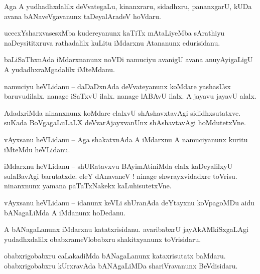 \documentclass{article}
\begin{document}
\begin{mng}%
Aga A yudhadhxdalilx deVvategaLu, kinanxraru, sidadhxru, pananxgarU, kUDa avana bANaveVgavanunx 
taDeyalAradeV hoVdaru.
\end{mng}

\begin{mng}%
ucecxYsharxvasesxMba kudereyanunx kaTiTx mAtaLiyeMba sArathiyu naDeysititxruva rathadalilx kuLitu 
iMdarxnu Atananunx edurisidanu.
\end{mng}

\begin{mng}%
baLiSaThxnAda iMdarxnanunx noVDi namuciyu avanigU avana anuyAyigaLigU A yudadhxraMgadalilx iMteMdanu.
\end{mng}

\begin{mng}%
namuciyu heVLidanu -- daDaDxnAda deVvateyanunx koMdare yashasUsx baruvudilalx. nanage iSaTxvU 
ilalx. nanage lABAvU ilalx. A jayavu jayavU alalx.
\end{mng}

\begin{mng}%
AdadxriMda ninanxnunx koMdare elalxvU shAshavxtavAgi sididhxsutatxve. suKada BoVgagaLuLaLX 
deVvarAjayxvanUnx shAshavtavAgi hoMdutetxVne.
\end{mng}

\begin{mng}%
vAyxsanu heVLidanu -- Aga shakatxnAda A iMdarxnu A namuciyanunx kuritu iMteMdu heVLidanu.
\end{mng}

\begin{mng}%
iMdarxnu heVLidanu -- shURatavxvu BAyimAtiniMda elalx kaDeyalilxyU sulaBavAgi barutatxde. eleY 
dAnavaneV ! ninage shwrayxvidadxre toVrisu. ninanxnunx yamana paTaTxNakekx kaLuhisutetxVne.
\end{mng}

\begin{mng}%
vAyxsanu heVLidanu -- idanunx keVLi shUranAda deYtayxnu koVpagoMDu aidu bANagaLiMda A iMdanunx 
hoDedanu.
\end{mng}

\begin{mng}%
A bANagaLanunx iMdarxnu katatxrisidanu. avaribabxrU jayAkAMkiSxgaLAgi yudadhxdalilx 
obabxrameVlobabxru shakitxyanunx toVrisidaru.
\end{mng}

\begin{mng}%
obabxrigobabxru caLakadiMda bANagaLanunx kataxrisutatx baMdaru. obabxrigobabxru kUrxravAda 
bANAgaLiMDa shariVravanunx BeVdisidaru.
\end{mng}
\end{document}
